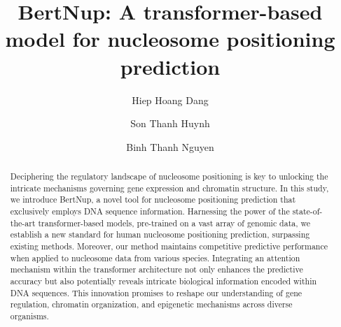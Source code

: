 \documentclass[a4paper,fleqn]{cas-dc}
\begin{document}
\let\WriteBookmarks\relax
\def\floatpagepagefraction{1}
\def\textpagefraction{.001}



\title [mode = title]{BertNup: A transformer-based model for nucleosome positioning prediction}                      



%
\author[1]{Hiep Hoang Dang}



\author[1,2]{Son Thanh Huynh}

\author[1,2]{Binh Thanh Nguyen}
\cormark[1]



\begin{abstract}
Deciphering the regulatory landscape of nucleosome positioning is key to unlocking the intricate mechanisms governing gene expression and chromatin structure. In this study, we introduce BertNup, a novel tool for nucleosome positioning prediction that exclusively employs DNA sequence information. Harnessing the power of the state-of-the-art transformer-based models, pre-trained on a vast array of genomic data, we establish a new standard for human nucleosome positioning prediction, surpassing existing methods. Moreover, our method maintains competitive predictive performance when applied to nucleosome data from various species. Integrating an attention mechanism within the transformer architecture not only enhances the predictive accuracy but also potentially reveals intricate biological information encoded within DNA sequences. This innovation promises to reshape our understanding of gene regulation, chromatin organization, and epigenetic mechanisms across diverse organisms.
\end{abstract}
\end{document}
